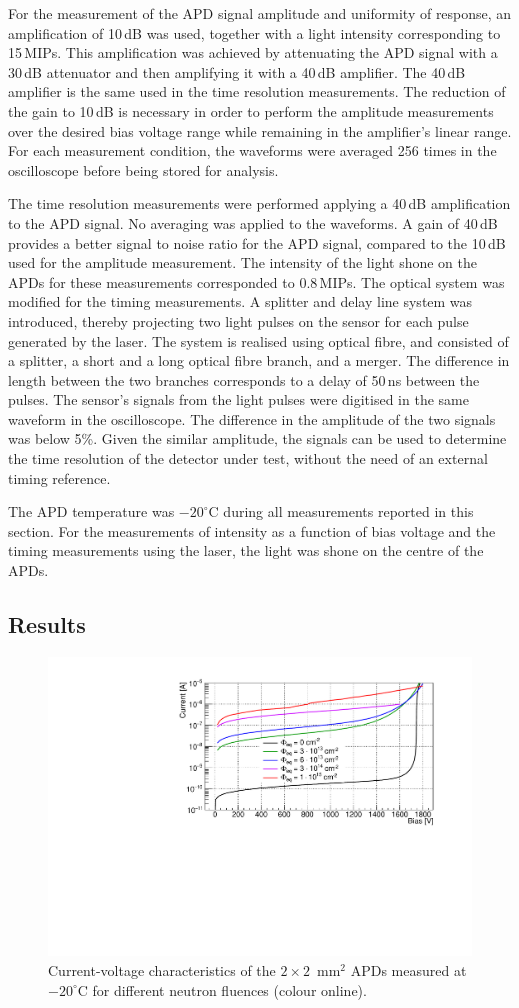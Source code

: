 \documentclass[review,number,sort&compress]{elsarticle}
\begin{document}
For the measurement of the APD signal amplitude and uniformity of response, an amplification of 10\,dB was used, together with a light intensity corresponding to 15\,MIPs.
This amplification was achieved by attenuating the APD signal with a 30\,dB attenuator and then amplifying it with a 40\,dB amplifier.
The 40\,dB amplifier is the same used in the time resolution measurements.
The reduction of the gain to 10\,dB is necessary in order to perform the amplitude measurements over the desired bias voltage range while remaining in the amplifier's linear range.
For each measurement condition, the waveforms were averaged 256 times in the oscilloscope before being stored for analysis.

The time resolution measurements were performed applying a 40\,dB amplification to the APD signal.
No averaging was applied to the waveforms.
A gain of 40\,dB provides a better signal to noise ratio for the APD signal, compared to the 10\,dB used for the amplitude measurement.
The intensity of the light shone on the APDs for these measurements corresponded to 0.8\,MIPs.
The optical system was modified for the timing measurements.
A splitter and delay line system was introduced, thereby projecting two light pulses on the sensor for each pulse generated by the laser.
The system is realised using optical fibre, and consisted of a splitter, a short and a long optical fibre branch, and a merger.
The difference in length between the two branches corresponds to a delay of 50\,ns between the pulses.
The sensor's signals from the light pulses were digitised in the same waveform in the oscilloscope.
The difference in the amplitude of the two signals was below 5\%.
Given the similar amplitude, the signals can be used to determine the time resolution of the detector under test, without the need of an external timing reference.

The APD temperature was $-20^\circ$C during all measurements reported in this section.
For the measurements of intensity as a function of bias voltage and the timing measurements using the laser, the light was shone on the centre of the APDs.

\subsection{Results}

\begin{figure}
  \centering
  \includegraphics[width = 0.6 \columnwidth]{IVnIrrad}
  \caption{Current-voltage characteristics of the $2 \times 2$~mm$^2$ APDs measured at $-20^\circ$C for different neutron fluences (colour online).}
  \label{fig:iv2x2}
\end{figure}
\end{document}
